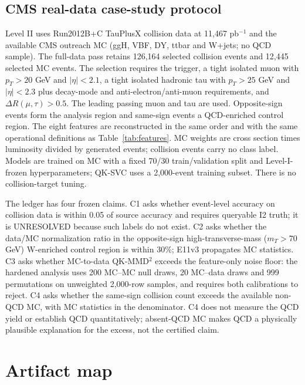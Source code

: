 \documentclass[11pt,a4paper]{article}
\begin{document}
\subsection{CMS real-data case-study protocol}

Level II uses Run2012B+C TauPlusX collision data at 11,467 pb$^{-1}$ and the
available CMS outreach MC (ggH, VBF, DY, ttbar and W+jets; no QCD sample).
The full-data pass retains 126,164 selected collision events and 12,445
selected MC events. The selection requires the
 trigger, a tight isolated muon with
$p_T>20$ GeV and $|\eta|<2.1$, a tight isolated hadronic tau with
$p_T>25$ GeV and $|\eta|<2.3$ plus decay-mode and anti-electron/anti-muon
requirements, and $\Delta R(\mu,\tau)>0.5$. The leading passing muon and tau
are used. Opposite-sign events form the analysis region and same-sign events a
QCD-enriched control region. The eight features are reconstructed in the same
order and with the same operational definitions as Table~\ref{tab:features}.
MC weights are cross section times luminosity divided by generated events;
collision events carry no class label. Models are trained on MC with a fixed
70/30 train/validation split and Level-I-frozen hyperparameters; QK-SVC uses a
2,000-event training subset. There is no collision-target tuning.

The ledger has four frozen claims. C1 asks whether event-level accuracy on
collision data is within 0.05 of source accuracy and requires queryable I2
truth; it is UNRESOLVED because such labels do not exist. C2 asks whether the
data/MC normalization ratio in the opposite-sign high-transverse-mass
($m_T>70$ GeV) W-enriched control region is within 30\%; E11v3 propagates MC
statistics. C3 asks whether MC-to-data QK-MMD$^2$ exceeds the feature-only
noise floor: the hardened analysis uses 200 MC--MC null draws, 20 MC--data
draws and 999 permutations on unweighted 2,000-row samples, and requires both
calibrations to reject. C4 asks whether the same-sign collision count exceeds
the available non-QCD MC, with MC statistics in the denominator. C4 does not
measure the QCD yield or establish QCD quantitatively; absent-QCD MC makes QCD
a physically plausible explanation for the excess, not the certified claim.

\section{Artifact map}

\normalsize
\end{document}
